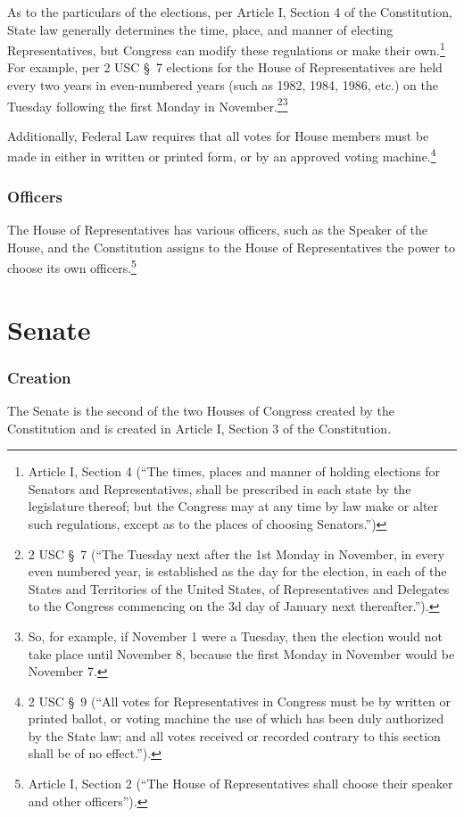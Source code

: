 As to the particulars of the elections, per Article I, Section 4 of the Constitution, State law generally determines the time, place, and manner of electing Representatives, but Congress can modify these regulations or make their own.\footnote{Article I, Section 4 (``The times, places and manner of holding elections for Senators and Representatives, shall be prescribed in each state by the legislature thereof; but the Congress may at any time by law make or alter such regulations, except as to the places of choosing Senators.'')}
For example, per 2 USC \S\ 7 elections for the House of Representatives are held every two years in even-numbered years (such as 1982, 1984, 1986, etc.) on the Tuesday following the first Monday in November.\footnote{2 USC \S\ 7 (``The Tuesday next after the 1st Monday in November, in every even numbered year, is established as the day for the election, in each of the States and Territories of the United States, of Representatives and Delegates to the Congress commencing on the 3d day of January next thereafter.'').}\footnote{So, for example, if November 1 were a Tuesday, then the election would not take place until November 8, because the first Monday in November would be November 7.}

Additionally, Federal Law requires that all votes for House members must be made in either in written or printed form, or by an approved voting machine.\footnote{2 USC \S\ 9 (``All votes for Representatives in Congress must be by written or printed ballot, or voting machine the use of which has been duly authorized by the State law; and all votes received or recorded contrary to this section shall be of no effect.'').}


\subsubsection{Officers}
The House of Representatives has various officers, such as the Speaker of the House, and the Constitution assigns to the House of Representatives the power to choose its own officers.\footnote{Article I, Section 2 (``The House of Representatives shall choose their speaker and other officers'').}

\section{Senate}

\subsubsection{Creation}
The Senate is the second of the two Houses of Congress created by the Constitution and is created in Article I, Section 3 of the Constitution.


